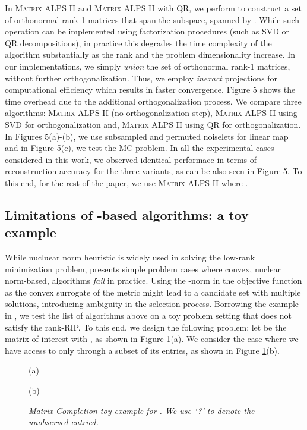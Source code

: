 \documentclass[twocolumn]{svjour3}
\begin{document}
In \textsc{Matrix ALPS II} and \textsc{Matrix ALPS II} with QR, we perform  to construct a set of orthonormal rank-1 matrices that span the subspace, spanned by . 
While such operation can be implemented using factorization procedures (such as SVD or QR decompositions), in practice this degrades the time complexity of the algorithm substantially as the rank  and the problem dimensionality increase. In our implementations, we simply {\it union} the set of orthonormal rank-1 matrices, without further orthogonalization. Thus, we employ {\it inexact} projections for computational efficiency which results in faster convergence. Figure 5 shows the time overhead due to the additional orthogonalization process. We compare three algorithms: \textsc{Matrix ALPS II} (no orthogonalization step), \textsc{Matrix ALPS II} using SVD for orthogonalization and, \textsc{Matrix ALPS II} using QR for orthogonalization. In Figures 5(a)-(b), we use subsampled and permuted noiselets for linear map  and in Figure 5(c), we test the MC problem. In all the experimental cases considered in this work, we observed identical performace in terms of reconstruction accuracy for the three variants, as can be also seen in Figure 5. To this end, for the rest of the paper, we use \textsc{Matrix ALPS II} where .

\subsection{Limitations of -based algorithms: a toy example}

While nucluear norm heuristic is widely used in solving the low-rank minimization problem, \cite{nonuclear} presents simple problem cases where convex, nuclear norm-based, algorithms {\it fail} in practice. Using the  -norm in the objective function as the convex surrogate of the  metric might lead to a candidate set with multiple solutions, introducing ambiguity in the selection process. Borrowing the example in \cite{nonuclear}, we test the list of algorithms above on a toy problem setting that does not satisfy the rank-RIP. To this end, we design the following problem: let  be the matrix of interest with , as shown in Figure \ref{fig:toy}(a). We consider the case where we have access to  only through a subset of its entries, as shown in Figure \ref{fig:toy}(b).


\begin{figure}[ht]
\begin{center}
\begin{minipage}[c]{0.25\linewidth}
 \hspace{0.6cm} (a)
\end{minipage}
\hspace{-0.5cm}
\begin{minipage}[c]{0.25\linewidth}
 \hspace{0.6cm}  (b)
\end{minipage}
\end{center}
\caption{\small\sl Matrix Completion toy example for . We use `?' to denote the unobserved entried. } \label{fig:toy}
\end{figure}
\end{document}
